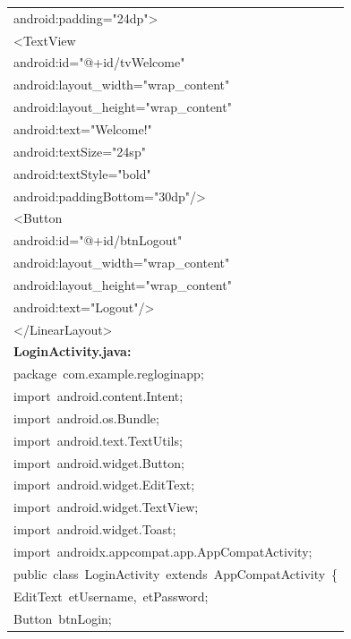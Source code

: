 \documentclass[a4paper,12pt]{article}
\begin{document}
\begin{longtable}{|p{}|}
{\ttfamily\small android:padding="24dp"\textgreater{}} \\
{\ttfamily\small \textless{}TextView} \\
{\ttfamily\small android:id="@+id/tvWelcome"} \\
{\ttfamily\small android:layout\_width="wrap\_content"} \\
{\ttfamily\small android:layout\_height="wrap\_content"} \\
{\ttfamily\small android:text="Welcome!"} \\
{\ttfamily\small android:textSize="24sp"} \\
{\ttfamily\small android:textStyle="bold"} \\
{\ttfamily\small android:paddingBottom="30dp"/\textgreater{}} \\
{\ttfamily\small \textless{}Button} \\
{\ttfamily\small android:id="@+id/btnLogout"} \\
{\ttfamily\small android:layout\_width="wrap\_content"} \\
{\ttfamily\small android:layout\_height="wrap\_content"} \\
{\ttfamily\small android:text="Logout"/\textgreater{}} \\
{\ttfamily\small \textless{}/LinearLayout\textgreater{}} \\
\hline
\rule{0pt}{13pt}\textbf{LoginActivity.java:} \\
\hline
{\ttfamily\small package\ com.example.regloginapp;} \\
{\ttfamily\small import\ android.content.Intent;} \\
{\ttfamily\small import\ android.os.Bundle;} \\
{\ttfamily\small import\ android.text.TextUtils;} \\
{\ttfamily\small import\ android.widget.Button;} \\
{\ttfamily\small import\ android.widget.EditText;} \\
{\ttfamily\small import\ android.widget.TextView;} \\
{\ttfamily\small import\ android.widget.Toast;} \\
{\ttfamily\small import\ androidx.appcompat.app.AppCompatActivity;} \\
{\ttfamily\small public\ class\ LoginActivity\ extends\ AppCompatActivity\ \{} \\
{\ttfamily\small EditText\ etUsername,\ etPassword;} \\
{\ttfamily\small Button\ btnLogin;} \\

\end{longtable}
\end{document}
